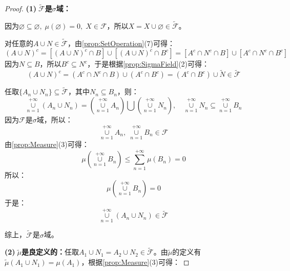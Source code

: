 \begin{proof}
	\textbf{(1)$\;\tilde{\mathscr{F}}$是$\sigma$域：}\par
	因为$\varnothing\subseteq\varnothing,\;\mu(\varnothing)=0,\;X\in\mathscr{F}$，所以$X=X\cup\varnothing\in\tilde{\mathscr{F}}$。\par
	对任意的$A\cup N\in\tilde{\mathscr{F}}$，由\cref{prop:SetOperation}(7)可得：
	\begin{equation*}
		(A\cup N)^c=[(A\cup N)^c\cap B]\cup[(A\cup N)^c\cap B^c]=[A^c\cap N^c\cap B]\cup[A^c\cap N^c\cap B^c]
	\end{equation*}
	因为$N\subseteq B$，所以$B^c\subseteq N^c$，于是根据\cref{prop:SigmaField}(2)可得：
	\begin{equation*}
		(A\cup N)^c=(A^c\cap N^c\cap B)\cup(A^c\cap B^c)=(A^c\cap B^c)\cup\tilde{N}\in\tilde{\mathscr{F}}
	\end{equation*}\par
	任取$\{A_n\cup N_n\}\subseteq\tilde{\mathscr{F}}$，其中$N_n\subseteq B_n$，则：
	\begin{equation*}
		\underset{n=1}{\overset{+\infty}{\cup}}(A_n\cup N_n)=\left(\underset{n=1}{\overset{+\infty}{\cup}}A_n\right)\bigcup\left(\underset{n=1}{\overset{+\infty}{\cup}}N_n\right),\quad\underset{n=1}{\overset{+\infty}{\cup}}N_n\subseteq\underset{n=1}{\overset{+\infty}{\cup}}B_n
	\end{equation*}
	因为$\mathscr{F}$是$\sigma$域，所以：
	\begin{equation*}
		\underset{n=1}{\overset{+\infty}{\cup}}A_n,\;\underset{n=1}{\overset{+\infty}{\cup}}B_n\in\mathscr{F}
	\end{equation*}
	由\cref{prop:Measure}(3)可得：
	\begin{equation*}
		\mu\left(\underset{n=1}{\overset{+\infty}{\cup}}B_n\right)\leqslant\sum_{n=1}^{+\infty}\mu(B_n)=0
	\end{equation*}
	所以：
	\begin{equation*}
		\mu\left(\underset{n=1}{\overset{+\infty}{\cup}}B_n\right)=0
	\end{equation*}
	于是：
	\begin{equation*}
		\underset{n=1}{\overset{+\infty}{\cup}}(A_n\cup N_n)\in\tilde{\mathscr{F}}
	\end{equation*}\par
	综上，$\tilde{\mathscr{F}}$是$\sigma$域。\par
	\textbf{(2)$\;\tilde{\mu}$是良定义的：}任取$A_1\cup N_1=A_2\cup N_2\in\tilde{\mathscr{F}}$。由$\tilde{\mu}$的定义有$\tilde{\mu}(A_1\cup N_1)=\mu(A_1)$，根据\cref{prop:Measure}(3)可得：

\end{proof}

